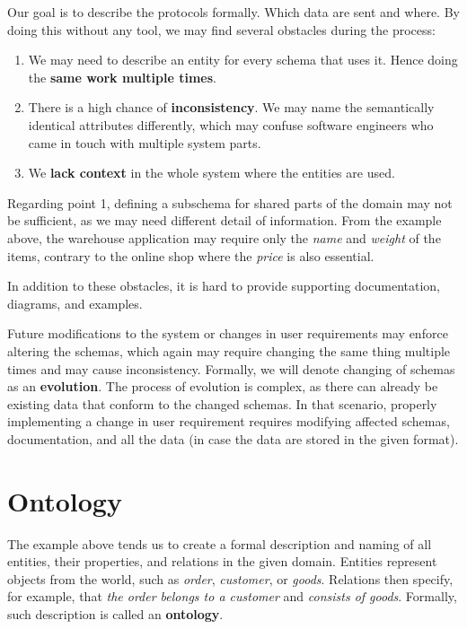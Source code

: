 Our goal is to describe the protocols formally. Which data are sent and where. By doing this without any tool, we may find several obstacles during the process:

\begin{enumerate}
    \item We may need to describe an entity for every schema that uses it. Hence doing the \textbf{same work multiple times}.
    \item There is a high chance of \textbf{inconsistency}. We may name the semantically identical attributes differently, which may confuse software engineers who came in touch with multiple system parts.
    \item We \textbf{lack context} in the whole system where the entities are used.
\end{enumerate}

Regarding point 1, defining a subschema for shared parts of the domain may not be sufficient, as we may need different detail of information. From the example above, the warehouse application may require only the \textit{name} and \textit{weight} of the items, contrary to the online shop where the \textit{price} is also essential.

In addition to these obstacles, it is hard to provide supporting documentation, diagrams, and examples.

Future modifications to the system or changes in user requirements may enforce altering the schemas, which again may require changing the same thing multiple times and may cause inconsistency. Formally, we will denote changing of schemas as an \textbf{evolution}. The process of evolution is complex, as there can already be existing data that conform to the changed schemas. In that scenario, properly implementing a change in user requirement requires modifying affected schemas, documentation, and all the data (in case the data are stored in the given format).

\section*{Ontology}

The example above tends us to create a formal description and naming of all entities, their properties, and relations in the given domain. Entities represent objects from the world, such as \textit{order}, \textit{customer}, or \textit{goods}. Relations then specify, for example, that \textit{the order belongs to a customer} and \textit{consists of goods}. Formally, such description is called an \textbf{ontology}.

